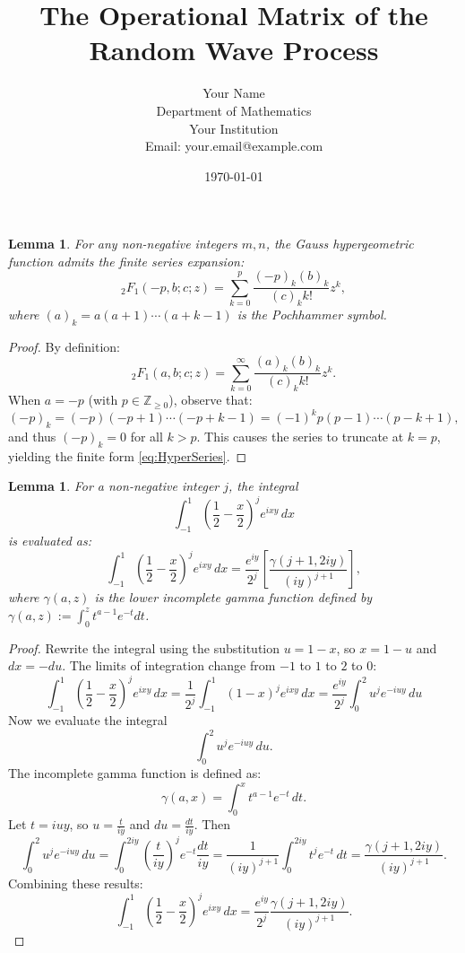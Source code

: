 \documentclass[12pt]{article}
\title{The Operational Matrix of the Random Wave Process}
\author{Your Name \\ Department of Mathematics \\ Your Institution \\ Email: your.email@example.com}
\date{\today}
\newtheorem{lemma}[theorem]{Lemma}
\begin{document}
\maketitle

\begin{lemma}\label{lem:HyperExpansions}
For any non-negative integers $m, n$, the Gauss hypergeometric function admits the finite series expansion:
\begin{equation}\label{eq:HyperSeries}
{}_2F_1(-p, b; c; z) = \sum_{k=0}^p \frac{(-p)_k (b)_k}{(c)_k k!} z^k,
\end{equation}
where $(a)_k = a(a+1)\cdots(a+k-1)$ is the Pochhammer symbol.
\end{lemma}

\begin{proof}
By definition:
\[
{}_2F_1(a, b; c; z) = \sum_{k=0}^\infty \frac{(a)_k (b)_k}{(c)_k k!} z^k.
\]
When $a = -p$ (with \( p \in \mathbb{Z}_{\geq 0} \)), observe that:
\[
(-p)_k = (-p)(-p+1)\cdots(-p+k-1) = (-1)^k p(p-1)\cdots(p-k+1),
\]
and thus $(-p)_k = 0$ for all $k>p$. This causes the series to truncate at $k=p$, yielding the finite form \eqref{eq:HyperSeries}.
\end{proof}

\begin{lemma}\label{lem:IntegralGamma}
For a non-negative integer $j$, the integral
\[
\int_{-1}^1 \left(\frac{1}{2}-\frac{x}{2}\right)^j e^{i x y} \, dx
\]
is evaluated as:
\begin{equation}\label{eq:IntegralGamma}
\int_{-1}^1 \left(\frac{1}{2}-\frac{x}{2}\right)^j e^{i x y} \, dx =
\frac{e^{iy}}{2^j}\left[\frac{\gamma(j+1,2iy)}{(iy)^{j+1}}\right],
\end{equation}
where $\gamma(a, z)$ is the lower incomplete gamma function defined by $\gamma(a, z) := \int_0^z t^{a-1} e^{-t} dt$.
\end{lemma}

\begin{proof}
Rewrite the integral using the substitution \(u = 1 - x\), so \(x = 1 - u\) and \(dx = -du\). The limits of integration change from $-1$ to $1$ to $2$ to $0$:
\[
\int_{-1}^1 \left(\frac{1}{2} - \frac{x}{2}\right)^j e^{i x y} \, dx = \frac{1}{2^j} \int_{-1}^1 (1-x)^j e^{i x y} \, dx = \frac{e^{iy}}{2^j} \int_{0}^{2} u^j e^{-i u y} \, du
\]
Now we evaluate the integral
\[
\int_0^2 u^j e^{-i u y} \, du.
\]
The incomplete gamma function is defined as:
\[
\gamma(a, x) = \int_0^x t^{a-1} e^{-t} \, dt.
\]
Let \(t = iuy\), so \(u = \frac{t}{iy}\) and \(du = \frac{dt}{iy}\). Then
\[
\int_0^2 u^j e^{-i u y} \, du = \int_0^{2iy} \left(\frac{t}{iy}\right)^j e^{-t} \frac{dt}{iy} = \frac{1}{(iy)^{j+1}} \int_0^{2iy} t^j e^{-t} \, dt = \frac{\gamma(j+1, 2iy)}{(iy)^{j+1}}.
\]
Combining these results:
\[
\int_{-1}^1 \left(\frac{1}{2} - \frac{x}{2}\right)^j e^{i x y} \, dx = \frac{e^{iy}}{2^j} \frac{\gamma(j+1, 2iy)}{(iy)^{j+1}}.
\]
\end{proof}
\end{document}
